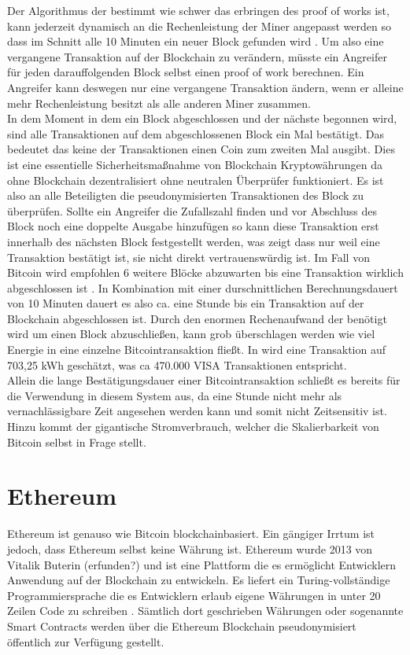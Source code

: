 \documentclass[11pt,a4paper]{scrreprt}
\begin{document}
Der Algorithmus der bestimmt wie schwer das erbringen des proof of works ist, kann jederzeit dynamisch an die Rechenleistung der Miner angepasst werden so dass im Schnitt alle 10 Minuten ein neuer Block gefunden wird \cite{btc-beginnerGuide}. Um also eine vergangene Transaktion auf der Blockchain zu verändern, müsste ein Angreifer für jeden darauffolgenden Block selbst einen proof of work berechnen. Ein Angreifer kann deswegen nur eine vergangene Transaktion ändern, wenn er alleine mehr Rechenleistung besitzt als alle anderen Miner zusammen. \\

In dem Moment in dem ein Block abgeschlossen und der nächste begonnen wird, sind alle Transaktionen auf dem abgeschlossenen Block ein Mal bestätigt. Das bedeutet das keine der Transaktionen einen Coin zum zweiten Mal ausgibt. Dies ist eine essentielle Sicherheitsmaßnahme von Blockchain Kryptowährungen da ohne Blockchain dezentralisiert ohne neutralen Überprüfer funktioniert. Es ist also an alle Beteiligten die pseudonymisierten Transaktionen des Block zu überprüfen. Sollte ein Angreifer die Zufallszahl finden und vor Abschluss des Block noch eine doppelte Ausgabe hinzufügen so kann diese Transaktion erst innerhalb des nächsten Block festgestellt werden, was zeigt dass nur weil eine Transaktion bestätigt ist, sie nicht direkt vertrauenswürdig ist. Im Fall von Bitcoin wird empfohlen 6 weitere Blöcke abzuwarten bis eine Transaktion wirklich abgeschlossen ist \cite{btc-blocksToConfirm}. In Kombination mit einer durschnittlichen Berechnungsdauert von 10 Minuten dauert es also ca. eine Stunde bis ein Transaktion auf der Blockchain abgeschlossen ist.
Durch den enormen Rechenaufwand der benötigt wird um einen Block abzuschließen, kann grob überschlagen werden wie viel Energie in eine einzelne Bitcointransaktion fließt. In \cite{btc-energyConsumption} wird eine Transaktion auf 703,25 kWh geschätzt, was ca 470.000 VISA Transaktionen entspricht.\\

Allein die lange Bestätigungsdauer einer Bitcointransaktion schließt es bereits für die Verwendung in diesem System aus, da eine Stunde nicht mehr als vernachlässigbare Zeit angesehen werden kann und somit nicht Zeitsensitiv ist. Hinzu kommt der gigantische Stromverbrauch, welcher die Skalierbarkeit von Bitcoin selbst in Frage stellt. 


\section{Ethereum}
\label{sec:ethereum}
Ethereum ist genauso wie Bitcoin blockchainbasiert. Ein gängiger Irrtum ist jedoch, dass Ethereum selbst keine Währung ist. Ethereum wurde 2013 von Vitalik Buterin (erfunden?) und ist eine Plattform die es ermöglicht Entwicklern Anwendung auf der Blockchain zu entwickeln. Es liefert ein Turing-vollständige Programmiersprache die es Entwicklern erlaub eigene Währungen in unter 20 Zeilen Code zu schreiben \cite{eth-buterin2013ethereum}. Sämtlich dort geschrieben Währungen oder sogenannte Smart Contracts werden über die Ethereum Blockchain pseudonymisiert öffentlich zur Verfügung gestellt. 
\end{document}
